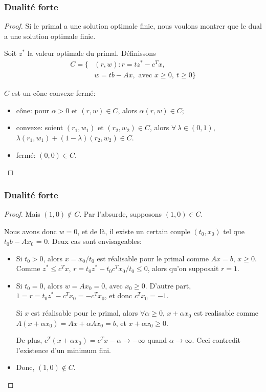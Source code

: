 \documentclass[usepdftitle=false]{beamer}
\begin{document}
\begin{frame}
\frametitle{Dualité forte}

\begin{proof}
Si le primal a une solution optimale finie, nous voulons montrer que le dual a une solution optimale finie.

\mbox{}

Soit $z^*$ la valeur optimale du primal. Définissons
\begin{align*}
C = \lbrace & (r, w): r = tz^* - c^Tx,\\
& w = tb-Ax, \mbox{ avec } x \geq 0,\ t \geq 0 \rbrace
\end{align*}

\mbox{}

$C$ est un cône convexe fermé:
\begin{itemize}
\item
cône: pour $\alpha > 0$ et $(r,w) \in C$, alors $\alpha(r,w) \in C$;
\item
convexe: soient $(r_1, w_1)$ et $(r_2, w_2) \in C$, alors $\forall\, \lambda \in (0,1)$, $\lambda(r_1, w_1) + (1 -\lambda) (r_2, w_2) \in C$.
\item
fermé: $(0,0) \in C$.
\end{itemize}

\end{proof}

\end{frame}

\begin{frame}
\frametitle{Dualité forte}

\begin{proof}

Mais $(1,0) \notin C$. Par l'absurde, supposons $(1,0) \in C$.

Nous avons donc $w = 0$, et de là, il existe un certain couple $(t_0, x_0)$ tel que $t_0b - Ax_0$ = 0. Deux cas sont envisageables:
\begin{itemize}
\item
Si $t_0 > 0$, alors
$x = x_0/t_0$ est réalisable pour le primal comme $Ax = b$, $x \geq 0$. %
Comme $z^* \leq c^Tx$, $r = t_0z^* - t_0c^Tx_0/t_0 \leq 0$, alors qu'on supposait $r = 1$.
\item
Si $t_0 = 0$, alors $w = Ax_0 = 0$, avec $x_0 \geq 0$.
D'autre part, $1 = r = t_0z^* - c^Tx_0 = -c^Tx_0$, et donc $c^T x_0 = -1$.

Si $x$ est réalisable pour le primal, alors $\forall \alpha \geq 0$, $x+\alpha x_0$ est realisable comme $A(x+\alpha x_0) = Ax + \alpha A x_0 = b$, et $x+\alpha x_0 \geq 0$.

De plus, $c^T(x+\alpha x_0) = c^Tx - \alpha \rightarrow -\infty$ quand $\alpha \rightarrow \infty$.
Ceci contredit l'existence d'un minimum fini.
\item
Donc, $(1,0) \notin C$.
\end{itemize}

\end{proof}

\end{frame}
\end{document}
